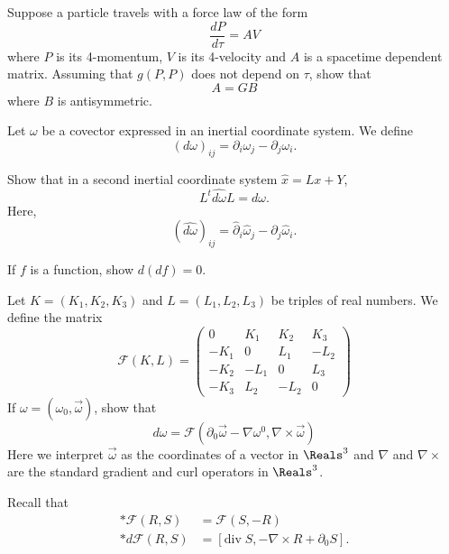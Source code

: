 \documentclass[minion]{homework}
\begin{document}
\begin{aproblems}

\hproblem Suppose a particle travels with a force law of the form
\[
\frac{dP}{d\tau} = A V
\]
where $P$ is its 4-momentum, $V$ is its 4-velocity and $A$ is a spacetime dependent matrix.  Assuming that $g(P,P)$ does not depend on $\tau$, show that
\[
A=GB
\]
where $B$ is antisymmetric.

\hproblem Let $\omega$ be a covector expressed in an inertial
coordinate system.  We define
\begin{equation}
(d\omega)_{ij} = \partial_i \omega_j - \partial_j \omega_i.
\end{equation}

\begin{subproblems}
\item
Show that in a second inertial coordinate system $\hat x = L x + Y$,
\begin{equation}
L^t \widehat{d\omega} L = d\omega.
\end{equation}
Here,
\begin{equation}
(\widehat{d\omega})_{ij} = \hat \partial_i \hat \omega_j - \hat \partial_j \hat \omega_i.
\end{equation}

\item If $f$ is a function, show $d(df)=0$.
\item Let $K=(K_1,K_2,K_3)$ and $L=(L_1,L_2,L_3)$ be triples of real numbers.  We define
the matrix
\begin{equation}
\mathcal{F}(K,L)= \begin{pmatrix} 0 & K_1 & K_2 & K_3 \\
-K_1& 0& L_1& -L_2 \\
-K_2& -L_1& 0& L_3 \\
-K_3& L_2& -L_2& 0\end{pmatrix}
\end{equation}
If $\omega = ( \omega_0, \overrightarrow{\omega})$, show that 
\begin{equation}
d\omega = \mathcal{F}(\partial_0 \overrightarrow{\omega}-\nabla \omega^0,\nabla \times 
\overrightarrow{\omega})
\end{equation}
Here we interpret $\overrightarrow{\omega}$ as the coordinates of a vector in $\Reals^3$
and $\nabla$ and $\nabla\times$ are the standard gradient and curl operators in $\Reals^3$.
\end{subproblems}

\hproblem Recall that
\begin{align}
*\mathcal{F}(R,S) &= \mathcal{F}(S,-R)\\
*d \mathcal{F}(R,S) &= [ \mathrm{div}\; S, -\nabla \times R + \partial_0 S].
\end{align}


\end{aproblems}
\end{document}
